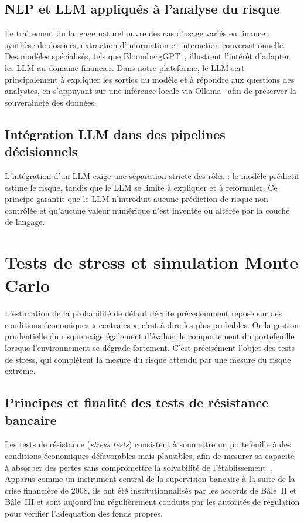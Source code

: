 \documentclass[a4paper,12pt,oneside]{report}
\begin{document}
\subsection{NLP et LLM appliqués à l'analyse du risque}

Le traitement du langage naturel ouvre des cas d'usage variés en finance : synthèse de
dossiers, extraction d'information et interaction conversationnelle. Des modèles spécialisés,
tels que BloombergGPT~\cite{wu2023bloomberggpt}, illustrent l'intérêt d'adapter les LLM au
domaine financier. Dans notre plateforme, le LLM sert principalement à expliquer les sorties du
modèle et à répondre aux questions des analystes, en s'appuyant sur une inférence locale via
Ollama~\cite{ollama} afin de préserver la souveraineté des données.

\subsection{Intégration LLM dans des pipelines décisionnels}

L'intégration d'un LLM exige une séparation stricte des rôles : le modèle prédictif estime
le risque, tandis que le LLM se limite à expliquer et à reformuler. Ce principe garantit que
le LLM n'introduit aucune prédiction de risque non contrôlée et qu'aucune valeur numérique
n'est inventée ou altérée par la couche de langage.

\section{Tests de stress et simulation Monte Carlo}

L'estimation de la probabilité de défaut décrite précédemment repose sur des conditions
économiques « centrales », c'est-à-dire les plus probables. Or la gestion prudentielle du
risque exige également d'évaluer le comportement du portefeuille lorsque l'environnement se
dégrade fortement. C'est précisément l'objet des tests de stress, qui complètent la mesure du
risque attendu par une mesure du risque extrême.

\subsection{Principes et finalité des tests de résistance bancaire}

Les tests de résistance (\textit{stress tests}) consistent à soumettre un portefeuille à des
conditions économiques défavorables mais plausibles, afin de mesurer sa capacité à absorber
des pertes sans compromettre la solvabilité de l'établissement~\cite{bcbs2018}. Apparus comme un
instrument central de la supervision bancaire à la suite de la crise financière de 2008, ils ont
été institutionnalisés par les accords de Bâle~II et Bâle~III et sont aujourd'hui régulièrement
conduits par les autorités de régulation pour vérifier l'adéquation des fonds propres.
\end{document}
